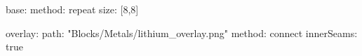 base:
  method: repeat
  size: [8,8]
  
overlay:
  path: "Blocks/Metals/lithium_overlay.png"
  method: connect
  innerSeams: true